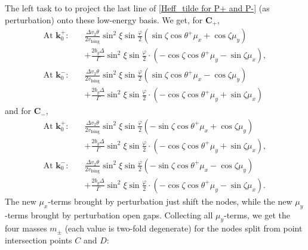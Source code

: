 \begin{subappendices}
			The left task to to project the last line of \eqref{Heff_tilde for P+ and P-} (as perturbation) onto these low-energy basis. We get, for $\bm{C}_+$, 
			\begin{align}
				\text{At }\bm{k}_0^+:\quad&\frac{\Delta v_2\theta}{2v_{\text{Ising}}}\sin^2\xi\sin\frac{\varphi}{2}(\sin\zeta\cos\theta^+\mu_x+\cos\zeta\mu_y)\nonumber\\
				&+\frac{2b_y\Delta}{\Gamma}\sin^2\xi\sin\frac{\varphi}{2}\cdot(-\cos\zeta\cos\theta^+\mu_y-\sin\zeta\mu_x),\label{H' for P+ at k0+}\\
				\text{At }\bm{k}_0^-:\quad&\frac{\Delta v_2\theta}{2v_{\text{Ising}}}\sin^2\xi\sin\frac{\varphi}{2}(\sin\zeta\cos\theta^+\mu_x-\cos\zeta\mu_y)\nonumber\\
				&+\frac{2b_y\Delta}{\Gamma}\sin^2\xi\sin\frac{\varphi}{2}\cdot(-\cos\zeta\cos\theta^+\mu_y+\sin\zeta\mu_x)\label{H' for P+ at k0-}
			\end{align}
			and for $\bm{C}_-$,
			\begin{align}
				\text{At }\bm{k}_0^+:\quad&\frac{\Delta v_2\theta}{2v_{\text{Ising}}}\sin^2\xi\sin\frac{\varphi}{2}(-\sin\zeta\cos\theta^+\mu_x+\cos\zeta\mu_y)\nonumber\\
				&+\frac{2b_y\Delta}{\Gamma}\sin^2\xi\sin\frac{\varphi}{2}\cdot(-\cos\zeta\cos\theta^+\mu_y+\sin\zeta\mu_x),\label{H' for P- at k0+}\\
				\text{At }\bm{k}_0^-:\quad&\frac{\Delta v_2\theta}{2v_{\text{Ising}}}\sin^2\xi\sin\frac{\varphi}{2}(-\sin\zeta\cos\theta^+\mu_x-\cos\zeta\mu_y)\nonumber\\
				&+\frac{2b_y\Delta}{\Gamma}\sin^2\xi\sin\frac{\varphi}{2}\cdot(-\cos\zeta\cos\theta^+\mu_y-\sin\zeta\mu_x).\label{H' for P- at k0-}
			\end{align}
			The new $\mu_x$-terms brought by perturbation just shift the nodes, while the new $\mu_y$-terms brought by perturbation open gaps. Collecting all $\mu_y$-terms, we get the four masses $m_\pm$ (each value is two-fold degenerate) for the nodes split from point intersection points $C$ and $D$:


\end{subappendices}
